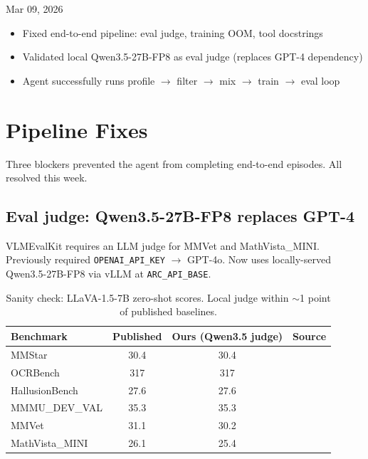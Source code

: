 \meetingheader
    {Mar 09, 2026}
    {}
    {}
    {\begin{itemize}
        \item Fixed end-to-end pipeline: eval judge, training OOM, tool docstrings
        \item Validated local Qwen3.5-27B-FP8 as eval judge (replaces GPT-4 dependency)
        \item Agent successfully runs profile $\to$ filter $\to$ mix $\to$ train $\to$ eval loop
    \end{itemize}}
    {}



\section{Pipeline Fixes}

Three blockers prevented the agent from completing end-to-end episodes. All resolved this week.

\subsection{Eval judge: Qwen3.5-27B-FP8 replaces GPT-4}

VLMEvalKit requires an LLM judge for MMVet and MathVista\_MINI.
Previously required \texttt{OPENAI\_API\_KEY} $\to$ GPT-4o.
Now uses locally-served Qwen3.5-27B-FP8 via vLLM at \texttt{ARC\_API\_BASE}.

\begin{table}[H]
\centering
\small
\caption{Sanity check: LLaVA-1.5-7B zero-shot scores. Local judge within $\sim$1 point of published baselines.}
\label{tab:judge-sanity}
\begin{tabular}{lccl}
\toprule
\textbf{Benchmark} & \textbf{Published} & \textbf{Ours (Qwen3.5 judge)} & \textbf{Source} \\
\midrule
MMStar & 30.4 & 30.4 & \cite{chen2024mmstar} \\
OCRBench & 317 & 317 & \cite{liu2023ocrbench} \\
HallusionBench & 27.6 & 27.6 & \cite{guan2024hallusionbench} \\
MMMU\_DEV\_VAL & 35.3 & 35.3 & \cite{yue2024mmmu} \\
MMVet & 31.1 & 30.2 & \cite{yu2024mmvet} \\
MathVista\_MINI & 26.1 & 25.4 & \cite{lu2024mathvista} \\
\bottomrule
\end{tabular}
\end{table}

